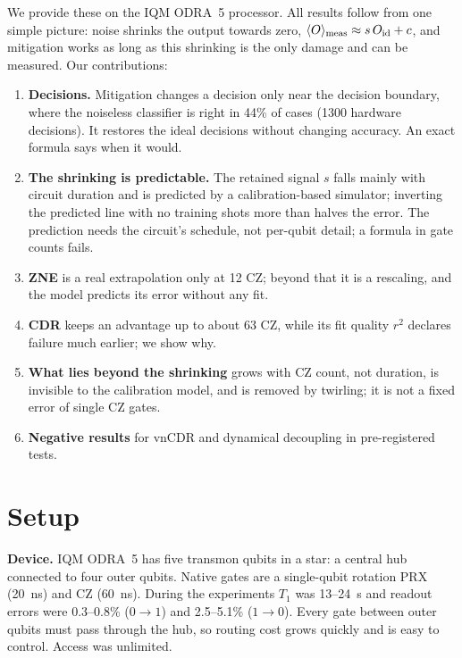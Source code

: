 \documentclass[aps,pra,twocolumn,superscriptaddress,nofootinbib,10pt]{revtex4-2}
\newcommand{\ev}[1]{\langle #1\rangle}
\newcommand{\Oid}{O_{\mathrm{id}}}
\begin{document}
We provide these on the IQM ODRA~5 processor. All results follow from one simple picture:
noise shrinks the output towards zero, $\ev{O}_{\rm meas}\approx s\,\Oid+c$, and mitigation
works as long as this shrinking is the only damage and can be measured. Our contributions:
\begin{enumerate}
\item \textbf{Decisions.} Mitigation changes a decision only near the decision boundary,
where the noiseless classifier is right in 44\% of cases (1300 hardware decisions). It
restores the ideal decisions without changing accuracy. An exact formula says when it would.
\item \textbf{The shrinking is predictable.} The retained signal $s$ falls mainly with circuit
duration and is predicted by a calibration-based simulator; inverting the predicted line
with no training shots more than halves the error. The prediction needs the circuit's schedule, not
per-qubit detail; a formula in gate counts fails.
\item \textbf{ZNE} is a real extrapolation only at 12 CZ; beyond that it is a rescaling,
and the model predicts its error without any fit.
\item \textbf{CDR} keeps an advantage up to about 63 CZ, while its fit quality $r^2$
declares failure much earlier; we show why.
\item \textbf{What lies beyond the shrinking} grows with CZ count, not duration, is invisible
to the calibration model, and is removed by twirling; it is not a fixed error of single CZ gates.
\item \textbf{Negative results} for vnCDR and dynamical decoupling in pre-registered tests.
\end{enumerate}

\section{Setup}

\textbf{Device.} IQM ODRA~5 has five transmon qubits in a star: a central hub connected to
four outer qubits. Native gates are a single-qubit rotation PRX (20~ns) and CZ (60~ns).
During the experiments $T_1$ was 13--24~\textmu s and readout errors were 0.3--0.8\%
($0\to1$) and 2.5--5.1\% ($1\to0$). Every gate between outer qubits must pass through the
hub, so routing cost grows quickly and is easy to control. Access was unlimited.
\end{document}
